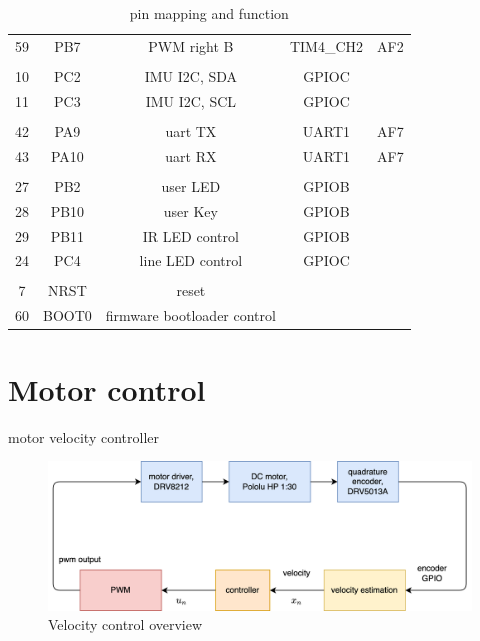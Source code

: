 \documentclass[12pt,twoside,onecolumn,openany,extrafontsizes,dvipsnames]{memoir}
\begin{document}
\begin{table}[h!]
\begin{tabular}{||c c c c c||}
                    59 & PB7 & PWM right B  & TIM4\_CH2 & AF2 \\ 
                    & & & & \\
                    10 & PC2 & IMU I2C, SDA & GPIOC &  \\ 
                    11 & PC3 & IMU I2C, SCL & GPIOC &  \\ 
                    & & & & \\
                    42 & PA9 & uart TX & UART1 & AF7 \\ 
                    43 & PA10 & uart RX & UART1 & AF7 \\ 
                    & & & & \\
                    27 & PB2 & user LED & GPIOB &  \\ 
                    28 & PB10 & user Key & GPIOB &  \\ 
                    29 & PB11 & IR LED control & GPIOB &  \\ 
                    24 & PC4 & line LED control & GPIOC &  \\ 
                    & & & & \\
                    7 & NRST & reset &  &  \\ 
                    60 & BOOT0 & firmware bootloader control &  &  \\ 
                \hline
                \end{tabular}
            \caption{pin mapping and function}
            \label{table:1}
        \end{table}


\chapter{Motor control}

    motor velocity controller

    \begin{figure}[!htb]
        \centering
        \includegraphics[scale=0.6]{../diagrams/control_generic/control_generic-motor_control.png}
        \caption{Velocity control overview}
        \label{fig:velocity_control_overview}
    \end{figure}
\end{document}
